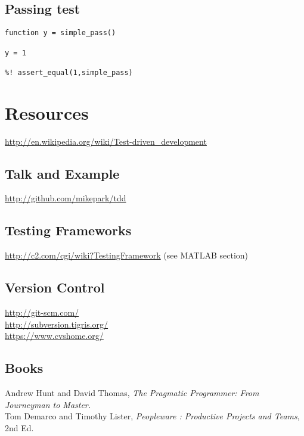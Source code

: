 \documentclass[twocolumn]{article}
\begin{document}
  \subsection{Passing test}
  \begin{verbatim}
function y = simple_pass()

y = 1

%! assert_equal(1,simple_pass)
  \end{verbatim}




  \section{Resources}

  \url{http://en.wikipedia.org/wiki/Test-driven_development}

  \subsection{Talk and Example}  
  \url{http://github.com/mikepark/tdd}

  \subsection{Testing Frameworks}  
  \url{http://c2.com/cgi/wiki?TestingFramework} (see MATLAB section)

  \subsection{Version Control}
  \url{http://git-scm.com/} \\
  \url{http://subversion.tigris.org/}\\
  \url{https://www.cvshome.org/}\

  \subsection{Books}
  Andrew Hunt and David Thomas,
  \textit{The Pragmatic Programmer: From Journeyman to Master.}\\
  Tom Demarco and Timothy Lister,
  \textit{Peopleware : Productive Projects and Teams}, 2nd Ed.
\end{document}

